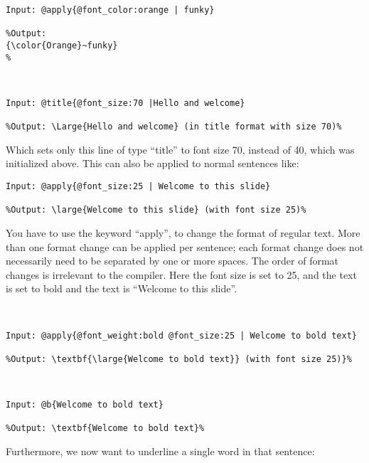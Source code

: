 \begin{lstlisting}[frame=single]
Input: @apply{@font_color:orange | funky}

%Output:
{\color{Orange}~funky}
%
\end{lstlisting}

 \\

\begin{lstlisting}[frame=single]
Input: @title{@font_size:70 |Hello and welcome}

%Output: \Large{Hello and welcome} (in title format with size 70)%
\end{lstlisting}
Which sets only this line of type ``title'' to font size 70, instead of 40, which was initialized above.
This can also be applied to normal sentences like:\\

\begin{lstlisting}[frame=single]
Input: @apply{@font_size:25 | Welcome to this slide}

%Output: \large{Welcome to this slide} (with font size 25)%
\end{lstlisting}
You have to use the keyword ``apply'', to change the format of regular text. More than one format change can be applied per sentence; each format change does not necessarily need to be separated by one or more spaces. The order of format changes is irrelevant to the compiler. Here the font size is set to 25, and the text is set to bold and the text is ``Welcome to this slide''.

 \\

\begin{lstlisting}[frame=single]
Input: @apply{@font_weight:bold @font_size:25 | Welcome to bold text}

%Output: \textbf{\large{Welcome to bold text}} (with font size 25)}%
\end{lstlisting}

 \\

\begin{lstlisting}[frame=single]
Input: @b{Welcome to bold text}

%Output: \textbf{Welcome to bold text}%
\end{lstlisting}
Furthermore, we now want to underline a single word in that sentence: \\

